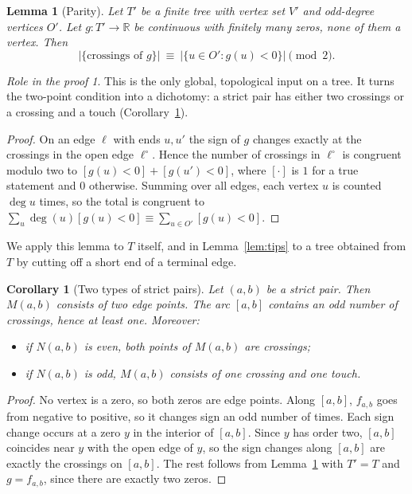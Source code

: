 \documentclass[11pt]{amsart}
\newtheorem{lemma}[theorem]{Lemma}
\newtheorem{corollary}[theorem]{Corollary}
\theoremstyle{definition}
\theoremstyle{remark}
\newtheorem*{role}{Role in the proof}
\newcommand{\M}{M}
\newcommand{\Odd}{O}
\newcommand{\Ver}{V}
\newcommand{\N}{N}
\begin{document}
\begin{lemma}[Parity]\label{lem:parity}
Let $T'$ be a finite tree with vertex set $\Ver'$ and odd-degree vertices $\Odd'$. Let $g:T'\to\mathbb R$ be continuous with finitely many zeros, none of them a vertex. Then
\[
  |\{\text{crossings of }g\}|\ \equiv\ |\{u\in\Odd':g(u)<0\}|\pmod 2 .
\]
\end{lemma}

\begin{role}
This is the only global, topological input on a tree. It turns the two-point condition into a dichotomy: a strict pair has either two crossings or a crossing and a touch (Corollary~\ref{cor:types}).
\end{role}

\begin{proof}
On an edge $\ell$ with ends $u,u'$ the sign of $g$ changes exactly at the crossings in the open edge $\ell^\circ$. Hence the number of crossings in $\ell^\circ$ is congruent modulo two to $[g(u)<0]+[g(u')<0]$, where $[\cdot]$ is $1$ for a true statement and $0$ otherwise. Summing over all edges, each vertex $u$ is counted $\deg u$ times, so the total is congruent to $\sum_{u}\deg(u)[g(u)<0]\equiv\sum_{u\in\Odd'}[g(u)<0]$.
\end{proof}

We apply this lemma to $T$ itself, and in Lemma~\ref{lem:tips} to a tree obtained from $T$ by cutting off a short end of a terminal edge.

\begin{corollary}[Two types of strict pairs]\label{cor:types}
Let $(a,b)$ be a strict pair. Then $\M(a,b)$ consists of two edge points. The arc $[a,b]$ contains an odd number of crossings, hence at least one. Moreover:
\begin{itemize}[nosep]
\item if $\N(a,b)$ is even, both points of $\M(a,b)$ are crossings;
\item if $\N(a,b)$ is odd, $\M(a,b)$ consists of one crossing and one touch.
\end{itemize}
\end{corollary}
\begin{proof}
No vertex is a zero, so both zeros are edge points. Along $[a,b]$, $f_{a,b}$ goes from negative to positive, so it changes sign an odd number of times. Each sign change occurs at a zero $y$ in the interior of $[a,b]$. Since $y$ has order two, $[a,b]$ coincides near $y$ with the open edge of $y$, so the sign changes along $[a,b]$ are exactly the crossings on $[a,b]$. The rest follows from Lemma~\ref{lem:parity} with $T'=T$ and $g=f_{a,b}$, since there are exactly two zeros.
\end{proof}
\end{document}
